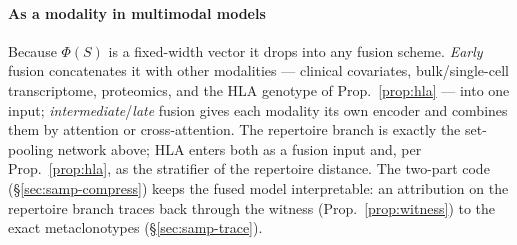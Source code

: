 \documentclass[11pt]{article}
\theoremstyle{oldplain}
\theoremstyle{oldrem}
\begin{document}
\paragraph{As a modality in multimodal models} Because $\Phi(S)$ is a fixed-width vector it drops into any
fusion scheme. \emph{Early} fusion concatenates it with other modalities --- clinical covariates,
bulk/single-cell transcriptome, proteomics, and the {\scshape HLA} genotype of Prop.~\ref{prop:hla} --- into
one input; \emph{intermediate}/\emph{late} fusion gives each modality its own encoder and combines them by
attention or cross-attention. The repertoire branch is exactly the set-pooling network above; {\scshape HLA}
enters both as a fusion input and, per Prop.~\ref{prop:hla}, as the stratifier of the repertoire distance. The
two-part code (\S\ref{sec:samp-compress}) keeps the fused model interpretable: an attribution on the repertoire
branch traces back through the witness (Prop.~\ref{prop:witness}) to the exact metaclonotypes
(\S\ref{sec:samp-trace}).
\end{document}
